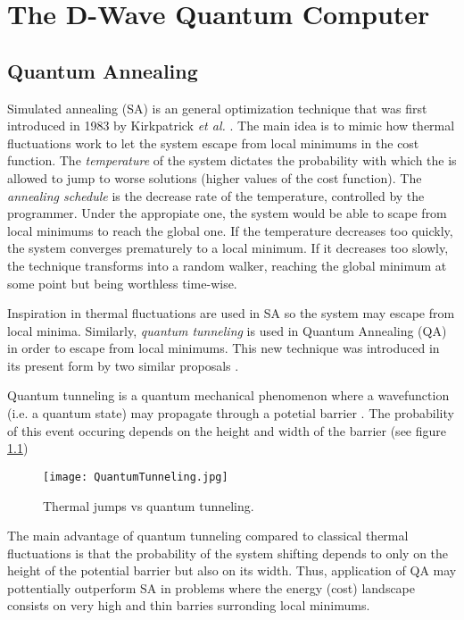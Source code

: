 \chapter{The D-Wave Quantum Computer}




\section{Quantum Annealing}


Simulated annealing (SA) is an general optimization technique that was first introduced in 1983 by Kirkpatrick \emph{et al.} \cite{Kirkpatrick1983}. The main idea is to mimic how thermal fluctuations work to let the system escape from local minimums in the cost function. The \emph{temperature} of the system dictates the probability with which the is allowed to jump to worse solutions (higher values of the cost function). The \emph{annealing schedule} is the decrease rate of the temperature, controlled by the programmer. Under the appropiate one, the system would be able to scape from local minimums to reach the global one. If the temperature decreases too quickly, the system converges prematurely to a local minimum. If it decreases too slowly, the technique transforms into a random walker, reaching the global minimum at some point but being worthless time-wise.

Inspiration in thermal fluctuations are used in SA so the system may escape from local minima. Similarly, \emph{quantum tunneling} is used in Quantum Annealing (QA) in order to escape from local minimums. This new technique was introduced in its present form by two similar proposals \cite{Finnila1994} \cite{Kadowaki1998}.

Quantum tunneling is a quantum mechanical phenomenon where a wavefunction (i.e. a quantum state) may propagate through a potetial barrier \cite{Nimtz2008}. The probability of this event occuring depends on the height and width of the barrier (see figure \ref{fig 2.1})

\begin{figure}[h]
	\texttt{[image: QuantumTunneling.jpg]}
	\centering
	\caption{Thermal jumps vs quantum tunneling.}
	\label{fig 2.1}
\end{figure}

The main advantage of quantum tunneling compared to classical thermal fluctuations is that the probability of the system shifting depends to only on the height of the potential barrier but also on its width. Thus, application of QA may pottentially outperform SA in problems where the energy (cost) landscape consists on very high and thin barries surronding local minimums. 


